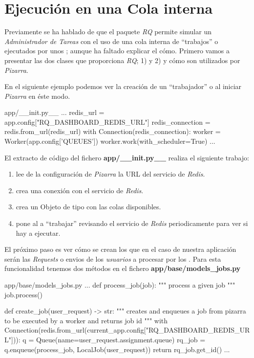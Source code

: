 \documentclass[11pt,spanish,listoffigures,listoftables]{tfgetsinf}
\begin{document}
\FloatBarrier

\section{Ejecución en una Cola interna}

Previamente se ha hablado de que el \gls{paquete} \textit{RQ} permite simular un \textit{Administrador de Tareas} con el uso de una \gls{cola} interna de ``trabajos'' o  ejecutados por unos ; aunque ha faltado explicar el cómo. Primero vamos a presentar las dos clases que proporciona \textit{RQ}; 1)  y 2)  y cómo son utilizados por \textit{Pizarra}.

En el siguiente ejemplo podemos ver la creación de un ``trabajador'' o  al iniciar \textit{Pizarra} en éste modo. 

\begin{code}{app/\_\_init.py\_\_}
...
redis_url = app.config["RQ_DASHBOARD_REDIS_URL"]
redis_connection = redis.from_url(redis_url)
with Connection(redis_connection):
	worker = Worker(app.config['QUEUES'])
	worker.work(with_scheduler=True)
...
\end{code}

El extracto de código del fichero \textbf{app/\_\_init.py\_\_} realiza el siguiente trabajo:

\begin{enumerate}
	\item lee de la configuración de \textit{Pizarra} la URL del servicio de \textit{Redis}.
	\item crea una conexión con el servicio de \textit{Redis}.
	\item crea un Objeto de tipo  con las \gls{cola}s disponibles.
	\item pone al  a ``trabajar'' revisando el servicio de \textit{Redis} periodicamente para ver si hay  a ejecutar.
\end{enumerate}

El próximo paso es ver cómo se crean los  que en el caso de nuestra aplicación serán las \textit{Requests} o \gls{envio}s de los \textit{usuarios} a procesar por los . Para esta funcionalidad tenemos dos métodos en el fichero \textbf{app/base/models\_jobs.py} \newline

\begin{code}{app/base/models\_jobs.py}
...
def process_job(job):
	"""
	process a given job
	"""
	job.process()

def create_job(user_request) -> str:
	"""
	creates and enqueues a job from pizarra to be executed by a worker and returns job id
	"""
	with Connection(redis.from_url(current_app.config["RQ_DASHBOARD_REDIS_URL"])):
	q = Queue(name=user_request.assignment.queue)
	rq_job = q.enqueue(process_job, LocalJob(user_request))
	return rq_job.get_id()
...
\end{code}
\end{document}
